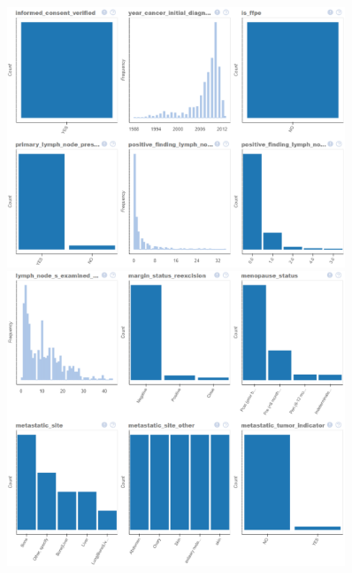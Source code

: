 \begin{figure}
	\includegraphics[width=0.9\textwidth]{NOTEBOOK/IMAGES_EDA/9}
	\includegraphics[width=0.9\textwidth]{NOTEBOOK/IMAGES_EDA/10}
\end{figure}

